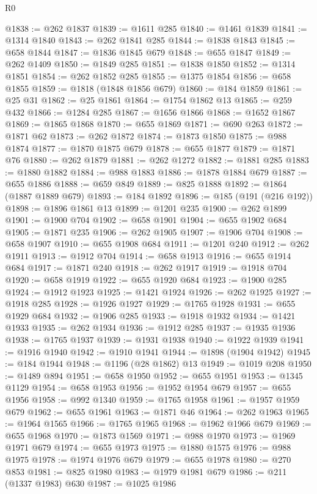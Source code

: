 \begin{lexlean}{R0}
\begin{coremodule}
@1838 := @262 @1837
@1839 := @1611 @285
@1840 := @1461 @1839
@1841 := @1314 @1840
@1843 := @262 @1841 @285
@1844 := @1838 @1843
@1845 := @658 @1844
@1847 := @1836 @1845 @679
@1848 := @655 @1847
@1849 := @262 @1409
@1850 := @1849 @285
@1851 := @1838 @1850
@1852 := @1314 @1851
@1854 := @262 @1852 @285
@1855 := @1375 @1854
@1856 := @658 @1855
@1859 := @1818 (@1848 @1856 @679)
@1860 := @184 @1859
@1861 := @25 @31
@1862 := @25 @1861
@1864 := @1754 @1862 @13
@1865 := @259 @432
@1866 := @1284 @285
@1867 := @1656 @1866
@1868 := @1652 @1867
@1869 := @1865 @1868
@1870 := @655 @1869
@1871 := @690 @263
@1872 := @1871 @62
@1873 := @262 @1872
@1874 := @1873 @1850
@1875 := @988 @1874
@1877 := @1870 @1875 @679
@1878 := @655 @1877
@1879 := @1871 @76
@1880 := @262 @1879
@1881 := @262 @1272
@1882 := @1881 @285
@1883 := @1880 @1882
@1884 := @988 @1883
@1886 := @1878 @1884 @679
@1887 := @655 @1886
@1888 := @659 @849
@1889 := @825 @1888
@1892 := @1864 (@1887 @1889 @679)
@1893 := @184 @1892
@1896 := @185 (@191 (@216 @192))
@1898 := @1896 @1861 @13
@1899 := @1201 @235
@1900 := @262 @1899
@1901 := @1900 @704
@1902 := @658 @1901
@1904 := @655 @1902 @684
@1905 := @1871 @235
@1906 := @262 @1905
@1907 := @1906 @704
@1908 := @658 @1907
@1910 := @655 @1908 @684
@1911 := @1201 @240
@1912 := @262 @1911
@1913 := @1912 @704
@1914 := @658 @1913
@1916 := @655 @1914 @684
@1917 := @1871 @240
@1918 := @262 @1917
@1919 := @1918 @704
@1920 := @658 @1919
@1922 := @655 @1920 @684
@1923 := @1900 @285
@1924 := @1912 @1923
@1925 := @1421 @1924
@1926 := @262 @1925
@1927 := @1918 @285
@1928 := @1926 @1927
@1929 := @1765 @1928
@1931 := @655 @1929 @684
@1932 := @1906 @285
@1933 := @1918 @1932
@1934 := @1421 @1933
@1935 := @262 @1934
@1936 := @1912 @285
@1937 := @1935 @1936
@1938 := @1765 @1937
@1939 := @1931 @1938
@1940 := @1922 @1939
@1941 := @1916 @1940
@1942 := @1910 @1941
@1944 := @1898 (@1904 @1942)
@1945 := @184 @1944
@1948 := @1196 (@28 @1862) @13
@1949 := @1019 @208
@1950 := @1489 @894
@1951 := @658 @1950
@1952 := @655 @1951
@1953 := @1345 @1129
@1954 := @658 @1953
@1956 := @1952 @1954 @679
@1957 := @655 @1956
@1958 := @992 @1340
@1959 := @1765 @1958
@1961 := @1957 @1959 @679
@1962 := @655 @1961
@1963 := @1871 @46
@1964 := @262 @1963
@1965 := @1964 @1565
@1966 := @1765 @1965
@1968 := @1962 @1966 @679
@1969 := @655 @1968
@1970 := @1873 @1569
@1971 := @988 @1970
@1973 := @1969 @1971 @679
@1974 := @655 @1973
@1975 := @1880 @1575
@1976 := @988 @1975
@1978 := @1974 @1976 @679
@1979 := @655 @1978
@1980 := @270 @853
@1981 := @825 @1980
@1983 := @1979 @1981 @679
@1986 := @211 (@1337 @1983) @630
@1987 := @1025 @1986

\end{coremodule}
\end{lexlean}

